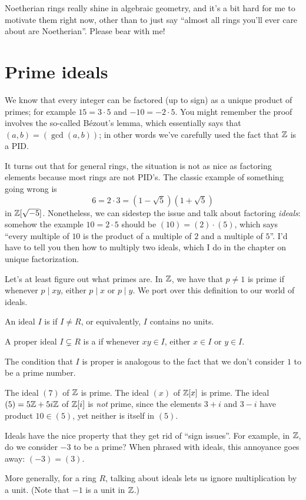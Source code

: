 Noetherian rings really shine in algebraic geometry,
and it's a bit hard for me to motivate them right now,
other than to just say ``almost all rings you'll ever care about are Noetherian''.
Please bear with me!

\section{Prime ideals}
We know that every integer can be factored (up to sign)
as a unique product of primes; for example $15 = 3 \cdot 5$
and $-10 = -2 \cdot 5$.
You might remember the proof involves the so-called B\'ezout's lemma,
which essentially says that $(a,b) = (\gcd(a,b))$;
in other words we've carefully used the fact that $\mathbb Z$ is a PID.

It turns out that for general rings, the situation is not as nice
as factoring elements because most rings are not PID's.
The classic example of something going wrong is
\[ 6 = 2 \cdot 3 = \left( 1-\sqrt5 \right)\left( 1+\sqrt5 \right) \]
in $\mathbb Z[\sqrt{-5}]$.
Nonetheless, we can sidestep the issue
and talk about factoring \emph{ideals}:
somehow the example $10 = 2 \cdot 5$ should be $(10) = (2) \cdot (5)$,
which says ``every multiple of $10$ is the product of a
multiple of $2$ and a multiple of $5$''.
I'd have to tell you then how to multiply two ideals, which I do
in the chapter on unique factorization.

Let's at least figure out what primes are.
In $\mathbb Z$, we have that $p \neq 1$ is prime if whenever $p \mid xy$,
either $p \mid x$ or $p \mid y$.
We port over this definition to our world of ideals.
\begin{definition}
	An ideal $I$ is  if $I \neq R$,
	or equivalently, $I$ contains no units.
\end{definition}
\begin{definition}
	\label{def:prime_ideal}
	A proper ideal $I \subsetneq R$ is a 
	if whenever $xy \in I$, either $x \in I$ or $y \in I$.
\end{definition}
The condition that $I$ is proper is analogous to the
fact that we don't consider $1$ to be a prime number.

\begin{example}
	\listhack
	\begin{enumerate}[(a)]
		\ii The ideal $(7)$ of $\mathbb Z$ is prime.
		\ii The ideal $(x)$ of $\mathbb Z[x]$ is prime.
		\ii The ideal $(5) = 5\mathbb Z + 5i\mathbb Z$ of $\mathbb Z[i]$ is \emph{not} prime, since
		the elements $3+i$ and $3-i$ have product $10 \in (5)$,
		yet neither is itself in $(5)$.
	\end{enumerate}
\end{example}
\begin{remark}
	\label{rem:unit_sign_issue}
	Ideals have the nice property that they get rid of ``sign issues''.
	For example, in $\mathbb Z$, do we consider $-3$ to be a prime?
	When phrased with ideals, this annoyance goes away: $(-3) = (3)$.
	
	More generally, for a ring $R$, talking about ideals
	lets us ignore multiplication by a unit.
	(Note that $-1$ is a unit in $\mathbb Z$.)
\end{remark}

